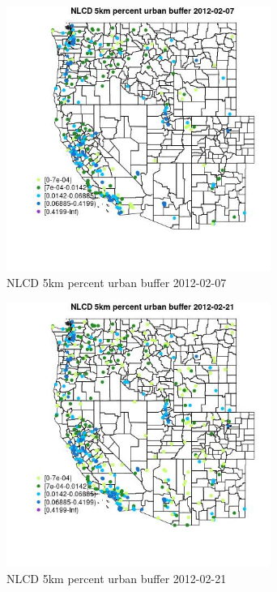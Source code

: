 \begin{figure} 
\centering  
\includegraphics[width=0.77\textwidth]{Code_Outputs/Report_ML_input_PM25_Step4_part_f_de_duplicated_aves_prioritize_24hr_obswNAs_MapObsNLCD_5km_percent_urban_buffer2012-02-07.jpg} 
\caption{\label{fig:Report_ML_input_PM25_Step4_part_f_de_duplicated_aves_prioritize_24hr_obswNAsMapObsNLCD_5km_percent_urban_buffer2012-02-07}NLCD 5km percent urban buffer 2012-02-07} 
\end{figure} 
 

\begin{figure} 
\centering  
\includegraphics[width=0.77\textwidth]{Code_Outputs/Report_ML_input_PM25_Step4_part_f_de_duplicated_aves_prioritize_24hr_obswNAs_MapObsNLCD_5km_percent_urban_buffer2012-02-21.jpg} 
\caption{\label{fig:Report_ML_input_PM25_Step4_part_f_de_duplicated_aves_prioritize_24hr_obswNAsMapObsNLCD_5km_percent_urban_buffer2012-02-21}NLCD 5km percent urban buffer 2012-02-21} 
\end{figure} 
 

